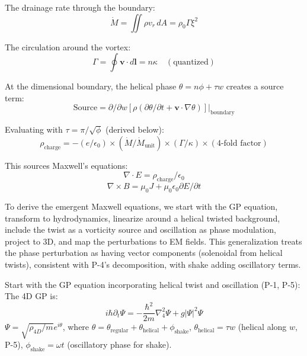 The drainage rate through the boundary:
\begin{equation}
\dot{M} = \iint \rho v_r \, dA = \rho_0 \Gamma \xi^2
\end{equation}

The circulation around the vortex:
\begin{equation}
\Gamma = \oint \mathbf{v} \cdot d\mathbf{l} = n\kappa  \quad (\text{quantized})
\end{equation}

At the dimensional boundary, the helical phase $\theta = n\phi + \tau w$ creates a source term:
\begin{equation}
\text{Source} = \partial / \partial w [\rho(\partial \theta / \partial t + \mathbf{v} \cdot \nabla \theta)]|_{\text{boundary}}
\end{equation}

Evaluating with $\tau = \pi/\sqrt{\phi}$ (derived below):
\begin{equation}
\rho_{\text{charge}} = -(e/\epsilon_0) \times (\dot{M}/\dot{M}_{\text{unit}}) \times (\Gamma/\kappa) \times (4\text{-fold factor})
\end{equation}

This sources Maxwell's equations:
\begin{equation}
\nabla \cdot E = \rho_{\text{charge}} / \epsilon_0
\end{equation}
\begin{equation}
\nabla \times B = \mu_0 J + \mu_0 \epsilon_0 \partial E / \partial t
\end{equation}

To derive the emergent Maxwell equations, we start with the GP equation, transform to hydrodynamics, linearize around a helical twisted background, include the twist as a vorticity source and oscillation as phase modulation, project to 3D, and map the perturbations to EM fields. This generalization treats the phase perturbation as having vector components (solenoidal from helical twists), consistent with P-4's decomposition, with shake adding oscillatory terms.

Start with the GP equation incorporating helical twist and oscillation (P-1, P-5): The 4D GP is:
\[ i \hbar \partial_t \Psi = - \frac{\hbar^2}{2m} \nabla_4^2 \Psi + g |\Psi|^2 \Psi \]
$\Psi = \sqrt{\rho_{4D} / m} e^{i \theta}$, where $\theta = \theta_{\text{regular}} + \theta_{\text{helical}} + \phi_{\text{shake}}$, $\theta_{\text{helical}} = \tau w$ (helical along $w$, P-5), $\phi_{\text{shake}} = \omega t$ (oscillatory phase for shake).

